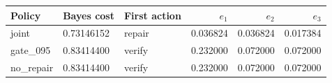 \begin{tabular}{lllrrr}
\toprule
Policy & Bayes cost & First action & $e_1$ & $e_2$ & $e_3$\\
\midrule
joint & 0.73146152 & repair & 0.036824 & 0.036824 & 0.017384\\
gate\_095 & 0.83414400 & verify & 0.232000 & 0.072000 & 0.072000\\
no\_repair & 0.83414400 & verify & 0.232000 & 0.072000 & 0.072000\\
\bottomrule
\end{tabular}
